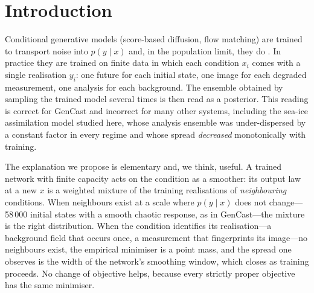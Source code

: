 \documentclass[11pt]{article}
\begin{document}
\section{Introduction}
\label{sec:intro}
Conditional generative models (score-based diffusion, flow matching) are trained to transport noise into $p(y\mid x)$ and, in the population limit, they do \citep{lipman2023flow}. In practice they are trained on finite data in which each condition $x_i$ comes with a single realisation $y_i$: one future for each initial state, one image for each degraded measurement, one analysis for each background. The ensemble obtained by sampling the trained model several times is then read as a posterior. This reading is correct for GenCast \citep{price2025gencast} and incorrect for many other systems, including the sea-ice assimilation model studied here, whose analysis ensemble was under-dispersed by a constant factor in every regime and whose spread \emph{decreased} monotonically with training.

The explanation we propose is elementary and, we think, useful. A trained network with finite capacity acts on the condition as a smoother: its output law at a new $x$ is a weighted mixture of the training realisations of \emph{neighbouring} conditions. When neighbours exist at a scale where $p(y\mid x)$ does not change---58\,000 initial states with a smooth chaotic response, as in GenCast---the mixture is the right distribution. When the condition identifies its realisation---a background field that occurs once, a measurement that fingerprints its image---no neighbours exist, the empirical minimiser is a point mass, and the spread one observes is the width of the network's smoothing window, which closes as training proceeds. No change of objective helps, because every strictly proper objective has the same minimiser.
\end{document}
